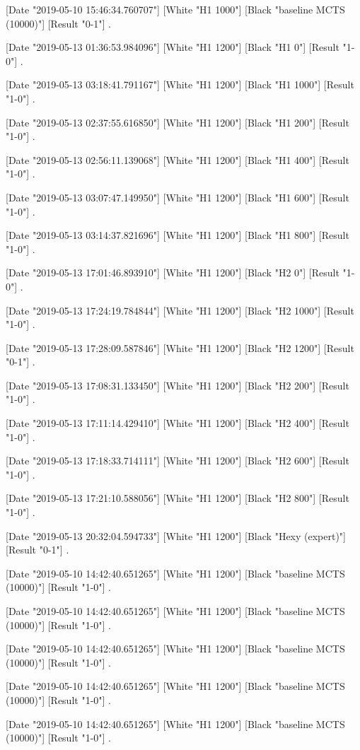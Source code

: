 {[Date "2019-05-10 15:46:34.760707"]
[White "H1 1000"]
[Black "baseline MCTS (10000)"]
[Result "0-1"]
.

[Date "2019-05-13 01:36:53.984096"]
[White "H1 1200"]
[Black "H1 0"]
[Result "1-0"]
.

[Date "2019-05-13 03:18:41.791167"]
[White "H1 1200"]
[Black "H1 1000"]
[Result "1-0"]
.

[Date "2019-05-13 02:37:55.616850"]
[White "H1 1200"]
[Black "H1 200"]
[Result "1-0"]
.

[Date "2019-05-13 02:56:11.139068"]
[White "H1 1200"]
[Black "H1 400"]
[Result "1-0"]
.

[Date "2019-05-13 03:07:47.149950"]
[White "H1 1200"]
[Black "H1 600"]
[Result "1-0"]
.

[Date "2019-05-13 03:14:37.821696"]
[White "H1 1200"]
[Black "H1 800"]
[Result "1-0"]
.

[Date "2019-05-13 17:01:46.893910"]
[White "H1 1200"]
[Black "H2 0"]
[Result "1-0"]
.

[Date "2019-05-13 17:24:19.784844"]
[White "H1 1200"]
[Black "H2 1000"]
[Result "1-0"]
.

[Date "2019-05-13 17:28:09.587846"]
[White "H1 1200"]
[Black "H2 1200"]
[Result "0-1"]
.

[Date "2019-05-13 17:08:31.133450"]
[White "H1 1200"]
[Black "H2 200"]
[Result "1-0"]
.

[Date "2019-05-13 17:11:14.429410"]
[White "H1 1200"]
[Black "H2 400"]
[Result "1-0"]
.

[Date "2019-05-13 17:18:33.714111"]
[White "H1 1200"]
[Black "H2 600"]
[Result "1-0"]
.

[Date "2019-05-13 17:21:10.588056"]
[White "H1 1200"]
[Black "H2 800"]
[Result "1-0"]
.

[Date "2019-05-13 20:32:04.594733"]
[White "H1 1200"]
[Black "Hexy (expert)"]
[Result "0-1"]
.

[Date "2019-05-10 14:42:40.651265"]
[White "H1 1200"]
[Black "baseline MCTS (10000)"]
[Result "1-0"]
.

[Date "2019-05-10 14:42:40.651265"]
[White "H1 1200"]
[Black "baseline MCTS (10000)"]
[Result "1-0"]
.

[Date "2019-05-10 14:42:40.651265"]
[White "H1 1200"]
[Black "baseline MCTS (10000)"]
[Result "1-0"]
.

[Date "2019-05-10 14:42:40.651265"]
[White "H1 1200"]
[Black "baseline MCTS (10000)"]
[Result "1-0"]
.

[Date "2019-05-10 14:42:40.651265"]
[White "H1 1200"]
[Black "baseline MCTS (10000)"]
[Result "1-0"]
.

}
